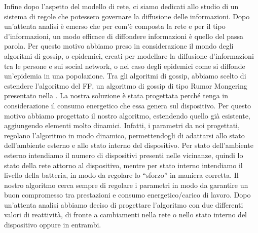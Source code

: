 Infine dopo l'aspetto del modello di rete, ci siamo dedicati allo studio di un sistema di regole che potessero governare la diffusione delle informazioni. Dopo un'attenta analisi è emerso che per com'è composta la rete e per il tipo d'informazioni, un modo efficace di diffondere informazioni è quello del passa parola. Per questo motivo abbiamo preso in considerazione il mondo degli algoritmi di gossip, o epidemici, creati per modellare la diffusione d'informazioni tra le persone e sui social network, o nel caso degli epidemici come si diffonde un'epidemia in una popolazione. Tra gli algoritmi di gossip, abbiamo scelto di estendere l'algoritmo del \acl{FF}, un algoritmo di gossip di tipo Rumor Mongering presentato nella . La nostra soluzione è stata progettata perché tenga in considerazione il consumo energetico che essa genera sul dispositivo. Per questo motivo abbiamo progettato il nostro algoritmo, estendendo quello già esistente, aggiungendo elementi molto dinamici. Infatti, i parametri da noi progettati, regolano l'algoritmo in modo dinamico, permettendogli di adattarsi allo stato dell'ambiente esterno e allo stato interno del dispositivo. Per stato dell'ambiente esterno intendiamo il numero di dispositivi presenti nelle vicinanze, quindi lo stato della rete attorno al dispositivo, mentre per stato interno intendiamo il livello della batteria, in modo da regolare lo “sforzo” in maniera corretta. Il nostro algoritmo cerca sempre di regolare i parametri in modo da garantire un buon compromesso tra prestazioni e consumo energetico/carico di lavoro. Dopo un'attenta analisi abbiamo deciso di progettare l'algoritmo con due differenti valori di reattività, di fronte a cambiamenti nella rete o nello stato interno del dispositivo oppure in entrambi.
\bigskip

